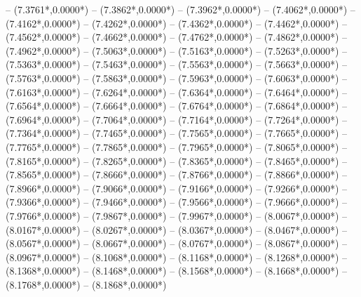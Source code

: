 {	-- ({7.3761*\dx},{0.0000*\dy})
	-- ({7.3862*\dx},{0.0000*\dy})
	-- ({7.3962*\dx},{0.0000*\dy})
	-- ({7.4062*\dx},{0.0000*\dy})
	-- ({7.4162*\dx},{0.0000*\dy})
	-- ({7.4262*\dx},{0.0000*\dy})
	-- ({7.4362*\dx},{0.0000*\dy})
	-- ({7.4462*\dx},{0.0000*\dy})
	-- ({7.4562*\dx},{0.0000*\dy})
	-- ({7.4662*\dx},{0.0000*\dy})
	-- ({7.4762*\dx},{0.0000*\dy})
	-- ({7.4862*\dx},{0.0000*\dy})
	-- ({7.4962*\dx},{0.0000*\dy})
	-- ({7.5063*\dx},{0.0000*\dy})
	-- ({7.5163*\dx},{0.0000*\dy})
	-- ({7.5263*\dx},{0.0000*\dy})
	-- ({7.5363*\dx},{0.0000*\dy})
	-- ({7.5463*\dx},{0.0000*\dy})
	-- ({7.5563*\dx},{0.0000*\dy})
	-- ({7.5663*\dx},{0.0000*\dy})
	-- ({7.5763*\dx},{0.0000*\dy})
	-- ({7.5863*\dx},{0.0000*\dy})
	-- ({7.5963*\dx},{0.0000*\dy})
	-- ({7.6063*\dx},{0.0000*\dy})
	-- ({7.6163*\dx},{0.0000*\dy})
	-- ({7.6264*\dx},{0.0000*\dy})
	-- ({7.6364*\dx},{0.0000*\dy})
	-- ({7.6464*\dx},{0.0000*\dy})
	-- ({7.6564*\dx},{0.0000*\dy})
	-- ({7.6664*\dx},{0.0000*\dy})
	-- ({7.6764*\dx},{0.0000*\dy})
	-- ({7.6864*\dx},{0.0000*\dy})
	-- ({7.6964*\dx},{0.0000*\dy})
	-- ({7.7064*\dx},{0.0000*\dy})
	-- ({7.7164*\dx},{0.0000*\dy})
	-- ({7.7264*\dx},{0.0000*\dy})
	-- ({7.7364*\dx},{0.0000*\dy})
	-- ({7.7465*\dx},{0.0000*\dy})
	-- ({7.7565*\dx},{0.0000*\dy})
	-- ({7.7665*\dx},{0.0000*\dy})
	-- ({7.7765*\dx},{0.0000*\dy})
	-- ({7.7865*\dx},{0.0000*\dy})
	-- ({7.7965*\dx},{0.0000*\dy})
	-- ({7.8065*\dx},{0.0000*\dy})
	-- ({7.8165*\dx},{0.0000*\dy})
	-- ({7.8265*\dx},{0.0000*\dy})
	-- ({7.8365*\dx},{0.0000*\dy})
	-- ({7.8465*\dx},{0.0000*\dy})
	-- ({7.8565*\dx},{0.0000*\dy})
	-- ({7.8666*\dx},{0.0000*\dy})
	-- ({7.8766*\dx},{0.0000*\dy})
	-- ({7.8866*\dx},{0.0000*\dy})
	-- ({7.8966*\dx},{0.0000*\dy})
	-- ({7.9066*\dx},{0.0000*\dy})
	-- ({7.9166*\dx},{0.0000*\dy})
	-- ({7.9266*\dx},{0.0000*\dy})
	-- ({7.9366*\dx},{0.0000*\dy})
	-- ({7.9466*\dx},{0.0000*\dy})
	-- ({7.9566*\dx},{0.0000*\dy})
	-- ({7.9666*\dx},{0.0000*\dy})
	-- ({7.9766*\dx},{0.0000*\dy})
	-- ({7.9867*\dx},{0.0000*\dy})
	-- ({7.9967*\dx},{0.0000*\dy})
	-- ({8.0067*\dx},{0.0000*\dy})
	-- ({8.0167*\dx},{0.0000*\dy})
	-- ({8.0267*\dx},{0.0000*\dy})
	-- ({8.0367*\dx},{0.0000*\dy})
	-- ({8.0467*\dx},{0.0000*\dy})
	-- ({8.0567*\dx},{0.0000*\dy})
	-- ({8.0667*\dx},{0.0000*\dy})
	-- ({8.0767*\dx},{0.0000*\dy})
	-- ({8.0867*\dx},{0.0000*\dy})
	-- ({8.0967*\dx},{0.0000*\dy})
	-- ({8.1068*\dx},{0.0000*\dy})
	-- ({8.1168*\dx},{0.0000*\dy})
	-- ({8.1268*\dx},{0.0000*\dy})
	-- ({8.1368*\dx},{0.0000*\dy})
	-- ({8.1468*\dx},{0.0000*\dy})
	-- ({8.1568*\dx},{0.0000*\dy})
	-- ({8.1668*\dx},{0.0000*\dy})
	-- ({8.1768*\dx},{0.0000*\dy})
	-- ({8.1868*\dx},{0.0000*\dy})
}
